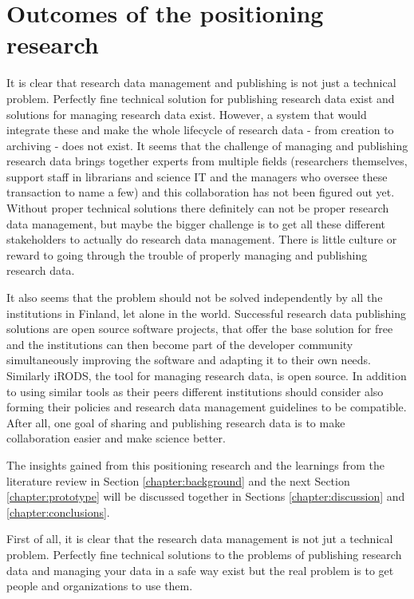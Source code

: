 \section{Outcomes of the positioning research}
\label{sec:positioning_outcomes}

It is clear that research data management and publishing is not just a
technical problem. Perfectly fine technical solution for publishing research
data exist and solutions for managing research data exist. However, a system
that would integrate these and make the whole lifecycle of research data -
from creation to archiving - does not exist. It seems that the challenge
of managing and publishing research data brings together experts from
multiple fields (researchers themselves, support staff in librarians and
science IT and the managers who oversee these transaction to name a few) and
this collaboration has not been figured out yet. Without proper technical
solutions there definitely can not be proper research data management, but
maybe the bigger challenge is to get all these different stakeholders to
actually do research data management. There is little culture or reward to
going through the trouble of properly managing and publishing research data.

It also seems that the problem should not be solved independently by all the
institutions in Finland, let alone in the world. Successful research data
publishing solutions are open source software projects, that offer the base
solution for free and the institutions can then become part of the developer
community simultaneously improving the software and adapting it to their own
needs. Similarly iRODS, the tool for managing research data, is open source. In
addition to using similar tools as their peers different institutions should
consider also forming their policies and research data management guidelines
to be compatible. After all, one goal of sharing and publishing research data
is to make collaboration easier and make science better.

The insights gained from this positioning research and the learnings from
the literature review in Section \ref{chapter:background} and the next Section
\ref{chapter:prototype} will be discussed together in Sections
\ref{chapter:discussion} and \ref{chapter:conclusions}.

\iffalse
First of all, it is clear that the research data management is not jut a
technical problem. Perfectly fine technical solutions to the problems of
publishing research data and managing your data in a safe way exist but the
real problem is to get people and organizations to use them.

